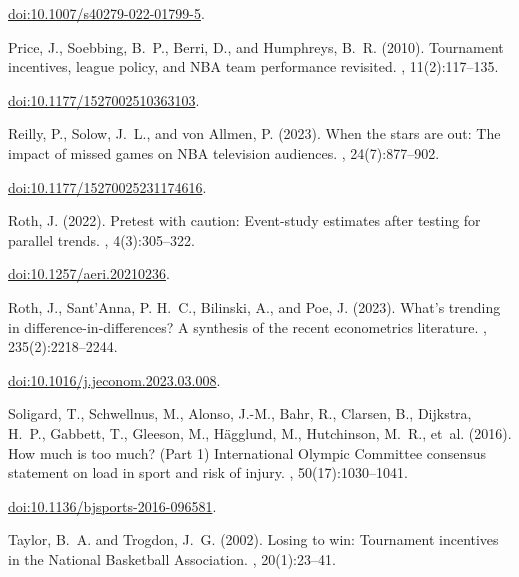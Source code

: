 \documentclass[11pt]{article}
\begin{document}
\begin{thebibliography}{}
\newblock \href{https://doi.org/10.1007/s40279-022-01799-5}{doi:10.1007/s40279-022-01799-5}.\par
{}
Price, J., Soebbing, B.~P., Berri, D., and Humphreys, B.~R. (2010).
\newblock Tournament incentives, league policy, and {NBA} team performance
  revisited.
, 11(2):117--135.

\newblock \href{https://doi.org/10.1177/1527002510363103}{doi:10.1177/1527002510363103}.\par
{}
Reilly, P., Solow, J.~L., and von Allmen, P. (2023).
\newblock When the stars are out: The impact of missed games on NBA television
  audiences.
, 24(7):877--902.

\newblock \href{https://doi.org/10.1177/15270025231174616}{doi:10.1177/15270025231174616}.\par
{}
Roth, J. (2022).
\newblock Pretest with caution: Event-study estimates after testing for
  parallel trends.
, 4(3):305--322.

\newblock \href{https://doi.org/10.1257/aeri.20210236}{doi:10.1257/aeri.20210236}.\par
{}
Roth, J., Sant'Anna, P. H.~C., Bilinski, A., and Poe, J. (2023).
\newblock What's trending in difference-in-differences? A synthesis of the
  recent econometrics literature.
, 235(2):2218--2244.

\newblock \href{https://doi.org/10.1016/j.jeconom.2023.03.008}{doi:10.1016/j.jeconom.2023.03.008}.\par
{}
Soligard, T., Schwellnus, M., Alonso, J.-M., Bahr, R., Clarsen, B., Dijkstra,
  H.~P., Gabbett, T., Gleeson, M., H{\"a}gglund, M., Hutchinson, M.~R., et~al.
  (2016).
\newblock How much is too much? (Part 1) {International Olympic Committee}
  consensus statement on load in sport and risk of injury.
, 50(17):1030--1041.

\newblock \href{https://doi.org/10.1136/bjsports-2016-096581}{doi:10.1136/bjsports-2016-096581}.\par
{}
Taylor, B.~A. and Trogdon, J.~G. (2002).
\newblock Losing to win: Tournament incentives in the National Basketball
  Association.
, 20(1):23--41.


\end{thebibliography}
\end{document}
